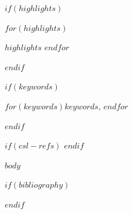 \documentclass[preprint,12pt,authoryear]{elsarticle}
\begin{document}
\begin{frontmatter}
$if(highlights)$
\begin{highlights}
$for(highlights)$\item $highlights$
$endfor$
\end{highlights}
$endif$

$if(keywords)$
\begin{keyword}
$for(keywords)$$keywords$\sep
$endfor$
\end{keyword}
$endif$


$if(csl-refs)$
\newlength{\cslhangindent}
\setlength{\cslhangindent}{1.5em}
\newenvironment{CSLReferences}%
  {$if(csl-hanging-indent)$\setlength{\parindent}{0pt}%
  \everypar{\setlength{\hangindent}{\cslhangindent}}\ignorespaces$endif$}%
  {\par}
$endif$


\end{frontmatter}


$body$

$if(bibliography)$

$endif$
\end{document}
